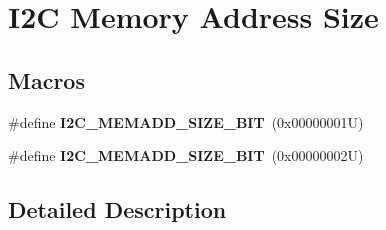 \hypertarget{group___i2_c___m_e_m_o_r_y___a_d_d_r_e_s_s___s_i_z_e}{}\section{I2C Memory Address Size}
\label{group___i2_c___m_e_m_o_r_y___a_d_d_r_e_s_s___s_i_z_e}
\subsection*{Macros}
\begin{DoxyCompactItemize}
\item 
\mbox{\label{group___i2_c___m_e_m_o_r_y___a_d_d_r_e_s_s___s_i_z_e_ga44007b689fa80deeab22820ad0b2dc6d}} 
\#define {\bfseries I2\+C\+\_\+\+M\+E\+M\+A\+D\+D\+\_\+\+S\+I\+Z\+E\+\_\+B\+IT}~(0x00000001\+U)
\item 
\mbox{\label{group___i2_c___m_e_m_o_r_y___a_d_d_r_e_s_s___s_i_z_e_ga5b8c4b7d245fd7ab998acf2c7edd61a4}} 
\#define {\bfseries I2\+C\+\_\+\+M\+E\+M\+A\+D\+D\+\_\+\+S\+I\+Z\+E\+\_\+B\+IT}~(0x00000002\+U)
\end{DoxyCompactItemize}


\subsection{Detailed Description}
